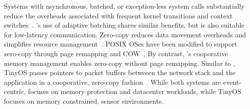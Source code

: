 Systems with asynchronous, batched, or exception-less system calls
substantially reduce the overheads associated with frequent kernel
transitions and context switches~\cite{DBLP:conf/osdi/HanMCR12,jeong2014mtcp,DBLP:journals/cacm/Rizzo12,DBLP:conf/osdi/SoaresS10}. \ix's use of adaptive batching shares similar benefits, but is also
suitable for low-latency communication.
Zero-copy reduces data movement overheads and simplifies resource
management~\cite{DBLP:journals/tocs/PaiDZ00}. POSIX OSes 
have been modified to support zero-copy through page remapping and COW~\cite{DBLP:conf/usenix/Chu96},
By contrast, \ix's cooporative memory management enables zero-copy without
page remapping. Similar to \ix, TinyOS passes pointers to packet buffers betweeen
the network stack and the application in a cooporative, zero-copy fashion~\cite{tinyosnet}.
While both systems are event-centric, \ix focuses on memory protection and
datacenter workloads, while TinyOS focuses on memory constrained, sensor environments.


